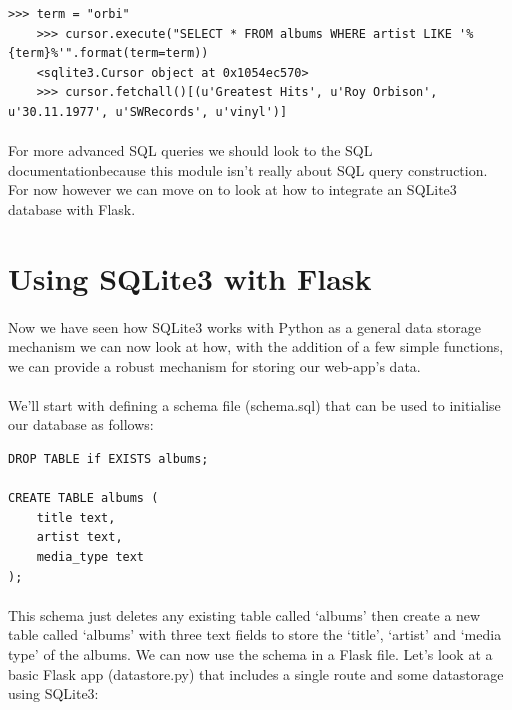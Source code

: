\documentclass[12pt, a4paper, oneside]{book}
\begin{document}
{\begin{lstlisting}[style=DOS]
    >>> term = "orbi"
    >>> cursor.execute("SELECT * FROM albums WHERE artist LIKE '%{term}%'".format(term=term))
    <sqlite3.Cursor object at 0x1054ec570>
    >>> cursor.fetchall()[(u'Greatest Hits', u'Roy Orbison', u'30.11.1977', u'SWRecords', u'vinyl')]
\end{lstlisting}

\paragraph{} For more advanced SQL queries we should look to the SQL documentationbecause this module isn't really about SQL query construction. For now however we can move on to look at how to integrate an SQLite3 database with Flask.

\section{Using SQLite3 with Flask}
\label{sqlite3-flask}
\paragraph{} Now we have seen how SQLite3 works with Python as a general data storage mechanism we can now look at how, with the addition of a few simple functions, we can provide a robust mechanism for storing our web-app's data.

\paragraph{} We'll start with defining a schema file (schema.sql) that can be used to initialise our database as follows:

\begin{lstlisting}
DROP TABLE if EXISTS albums;

CREATE TABLE albums (
    title text,
    artist text,
    media_type text
);
\end{lstlisting}

\paragraph{} This schema just deletes any existing table called `albums' then create a new table called `albums' with three text fields to store the `title', `artist' and `media type' of the albums. We can now use the schema in a Flask file. Let's look at a basic Flask app (datastore.py) that includes a single route and some datastorage using SQLite3:

}
\end{document}
